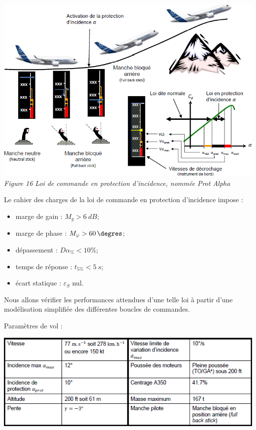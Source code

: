 \begin{multicols}{2}
\begin{center}
\includegraphics[width=\linewidth]{images/fig_19}
\textit{Figure 16 Loi de commande en protection d'incidence, nommée Prot Alpha}
\end{center}

Le cahier des charges de la loi de commande en protection d'incidence impose :
\begin{itemize}
\item marge de gain : $M_g>\SI{6}{dB}$;
\item marge de phase : $M_\varphi>\SI{60}{\degres}$;
\item dépassement : $D\alpha_{\%}<10\%$;
\item temps de réponse : $t_{5\%}<\SI{5}{s}$;
\item écart statique : $\varepsilon_S$ nul.
\end{itemize}

Nous allons vérifier les performances attendues d’une telle loi à partir d’une modélisation  simplifiée des différentes boucles de commandes.


Paramètres de vol : 
\begin{center}
\includegraphics[width=\linewidth]{images/fig_19_bis}
\end{center}


\end{multicols}

